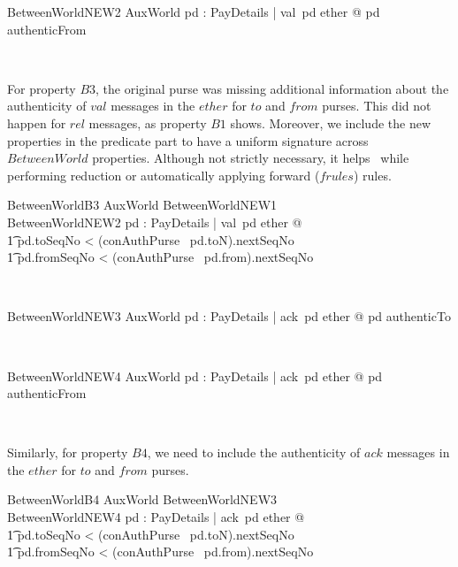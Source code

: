 \begin{LNewSDef}
\begin{schema}{BetweenWorldNEW2}
   AuxWorld
\where
   \forall pd : PayDetails | val~pd \in ether @ pd \in authenticFrom
\end{schema}~\end{LNewSDef}

For property $B3$, the original purse was missing additional information about the
authenticity of $val$ messages in the $ether$ for $to$ and $from$ purses. This did
not happen for $rel$ messages, as property $B1$ shows.
Moreover, we include the new properties in the predicate part to have a uniform signature
across  $BetweenWorld$ properties. Although not strictly necessary, it helps \zeves\ while
performing reduction or automatically applying forward ($frules$) rules.
%
\begin{LNewSDef}
\begin{schema}{BetweenWorldB3}
   AuxWorld
\where
   BetweenWorldNEW1 \\
   BetweenWorldNEW2
   \also
   \forall pd : PayDetails | val~pd \in ether @
  \\ %
  \t1 pd.toSeqNo < (conAuthPurse~ pd.toN).nextSeqNo
  \\ %
  \t1 \land pd.fromSeqNo < (conAuthPurse~ pd.from).nextSeqNo
\end{schema}~\end{LNewSDef}

\begin{LNewSDef}
\begin{schema}{BetweenWorldNEW3}
   AuxWorld
\where
   \forall pd : PayDetails | ack~pd \in ether @ pd \in authenticTo
\end{schema}~\end{LNewSDef}

\begin{LNewSDef}
\begin{schema}{BetweenWorldNEW4}
   AuxWorld
\where
   \forall pd : PayDetails | ack~pd \in ether @ pd \in authenticFrom
\end{schema}~\end{LNewSDef}

Similarly, for property $B4$, we need to include the authenticity of
$ack$ messages in the $ether$ for $to$ and $from$ purses.
%
\begin{LNewSDef}
\begin{schema}{BetweenWorldB4}
   AuxWorld
\where
   BetweenWorldNEW3 \\
   BetweenWorldNEW4
   \also
   \forall pd : PayDetails | ack~pd \in ether @
  \\ %
  \t1 pd.toSeqNo < (conAuthPurse~ pd.toN).nextSeqNo
  \\ %
  \t1 \land pd.fromSeqNo < (conAuthPurse~ pd.from).nextSeqNo
\end{schema}~\end{LNewSDef}

